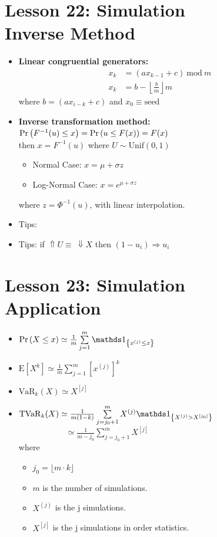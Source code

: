 \documentclass[10pt, french]{article}
\begin{document}
\begin{multicols*}{3}
\section*{Lesson 22: Simulation \\ Inverse Method}
\begin{itemize}[align=left,leftmargin=*]
    \item \textbf{Linear congruential generators:}
    \begin{align*}
        x_k &= (ax_{k-1}+c)\: \mathrm{mod}\: m \\
        x_k &= b - \left\lfloor \frac{b}{m} \right\rfloor m
    \end{align*}
    where $b = (ax_{i-k}+c)$ and $x_0\equiv\mathrm{seed}$
    \item \textbf{Inverse transformation method:}\\ $ \Pr \left( F^{-1}(u)\leq x \right) = \Pr \left( u\leq F(x) \right) = F(x) $ \\ then $x = F^{-1}(u)$ where $U \sim \mathrm{Unif}(0,1)$
    \begin{itemize}
        \item Normal Case: $x = \mu + \sigma z$
        \item Log-Normal Case: $x = e^{\mu + \sigma z}$
    \end{itemize}
    where $z = \Phi^{-1}(u)$, with linear interpolation.
    \item Tips: {\color{AppendixColor}}
    \item Tips: if $\Uparrow U \equiv\: \Downarrow X$ then $(1-u_i)\Rightarrow u_i$
\end{itemize}

\section*{Lesson 23: Simulation \\ Application}
\label{Lesson 23}
\begin{itemize}[align=left,leftmargin=*]
    \item $\prob{X \leq x} \simeq \frac{1}{m} \sum\limits_{j=1}^{m} \indic{x^{(j)} \leq x}  $
    \item $\mathrm{E}[X^k] \simeq \frac{1}{m} \sum\limits_{j=1}^{m} [x^{(j)}]^k  $
    \item $\mathrm{VaR}_k(X) \simeq X^{[j]} $
    \item $\mathrm{TVaR}_k(X) \simeq \frac{1}{m(1-k)} \sum\limits_{j=j_0+1}^{m} X^{(j)} \indic{X^{(j)}>X^{[j_0]}} $ \\ $\phantom{\mathrm{TVaR}_k(X)}  \simeq \frac{1}{m-j_0} \sum\limits_{j=j_0+1}^{m} X^{[j]} $ \\ where
    \begin{itemize}
        \item $j_0 = \lfloor m \cdot k \rfloor$
        \item $m$ is the number of simulations.
        \item $X^{(j)}$ is the j simulations.
        \item $X^{[j]}$ is the j simulations in order statistics.
    \end{itemize}
\end{itemize}


\end{multicols*}
\end{document}
